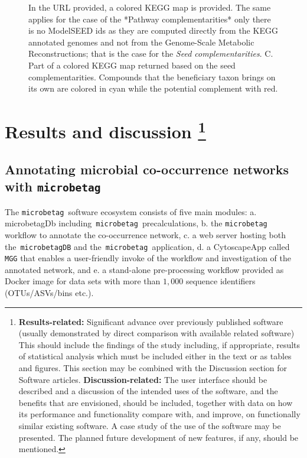 \documentclass[sn-mathphys,Numbered]{sn-jnl}  %
\theoremstyle{thmstyleone}%
\theoremstyle{thmstyletwo}%
\theoremstyle{thmstylethree}%
\newcommand{\microbetag}{\texttt{microbetag }}
\begin{document}
\begin{figure}[H]
{                In the URL provided, a colored KEGG map is provided.
                The same applies for the case of the *Pathway complementarities* only there is no ModelSEED ids as they are computed directly from the KEGG annotated genomes and not from the Genome-Scale Metabolic Reconstructions; that is the case for the \textit{Seed complementarities}.
                C. Part of a colored KEGG map returned based on the seed complementarities. 
                Compounds that the beneficiary taxon brings on its own are colored in cyan while the potential complement with red.
            }
            \label{fig:panels}
            \thispagestyle{empty} %
            \nolinenumbers %
        \end{figure}


\newpage

\section*{Results and discussion
\footnote{
    \textbf{Results-related: }
    Significant advance over previously published software (usually demonstrated by direct comparison with available related software)
    This should include the findings of the study including, if appropriate, results of statistical analysis which must be included either in the text or as tables and figures. 
    This section may be combined with the Discussion section for Software articles.
    \textbf{Discussion-related:}
    The user interface should be described and a discussion of the intended uses of the software, and the benefits that are envisioned, should be included, together with data on how its performance and functionality compare with, and improve, on functionally similar existing software. 
    A case study of the use of the software may be presented. 
    The planned future development of new features, if any, should be mentioned.
    }}
\label{sec:results-and-discussion}


    \subsection*{Annotating microbial co-occurrence networks with \microbetag}
    \label{subsec:running-wf}

        The \microbetag software ecosystem consists of five main modules:
        a. microbetagDb including~\microbetag precalculations,
        b. the \microbetag workflow to annotate the co-occurrence network,
        c. a web server hosting both the~\texttt{microbetagDB} and the~\microbetag application,
        d. a CytoscapeApp called \texttt{MGG} that enables a user-friendly invoke of the workflow and investigation of the annotated network, and
        e. a stand-alone pre-processing workflow provided as Docker image for data sets with more than $1,000$ sequence identifiers (OTUs/ASVs/bins etc.).
\end{document}
